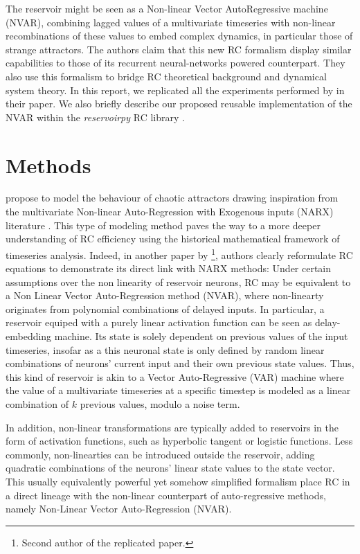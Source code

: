 The reservoir might be seen as a Non-linear Vector AutoRegressive machine (NVAR),
combining lagged values of a multivariate timeseries
with non-linear recombinations of these values to embed complex dynamics,
in particular those of strange attractors.
The authors claim that this new RC formalism display similar capabilities to those
of its recurrent neural-networks powered counterpart. They also use this formalism
to bridge RC theoretical background and dynamical system theory.
In this report, we replicated all the experiments performed by \citet{gauthier2021next}
in their paper. We also briefly describe our proposed reusable implementation
of the NVAR within the \emph{reservoirpy} RC library \supercite{trouvain2020}.


\section{Methods}

\citet{gauthier2021next} propose to model the behaviour of chaotic attractors drawing inspiration
from the multivariate Non-linear Auto-Regression with Exogenous inputs (NARX) literature \cite{billings2013}.
This type of modeling method paves the way to a more deeper understanding of RC efficiency using
the historical mathematical framework of timeseries analysis. Indeed, in another paper by \citet{bollt2021}
\footnote{Second author of the replicated paper.}, authors clearly reformulate RC equations to demonstrate
its direct link with NARX methods: Under certain assumptions over the non linearity of reservoir neurons,
RC may be equivalent to a Non Linear Vector Auto-Regression method (NVAR), where non-linearty originates
from polynomial combinations of delayed inputs. In particular, a reservoir equiped with a purely
linear activation function can be seen as delay-embedding machine. Its state is solely
dependent on previous values of the input timeseries, insofar as a this neuronal state is only defined by random linear
combinations of neurons' current input and their own previous state values. Thus, this kind of reservoir is
akin to a Vector Auto-Regressive (VAR) machine where the value of a multivariate
timeseries at a specific timestep is modeled as a linear combination of $k$ previous values, modulo a noise term.

In addition, non-linear transformations are typically added to reservoirs in the form of activation functions,
such as hyperbolic tangent or logistic functions. Less commonly, non-linearties can be introduced
outside the reservoir, adding quadratic combinations of the neurons' linear state values to the state vector.
This usually equivalently powerful yet somehow simplified formalism place
RC in a direct lineage with the non-linear counterpart of auto-regressive methods,
namely Non-Linear Vector Auto-Regression (NVAR).

